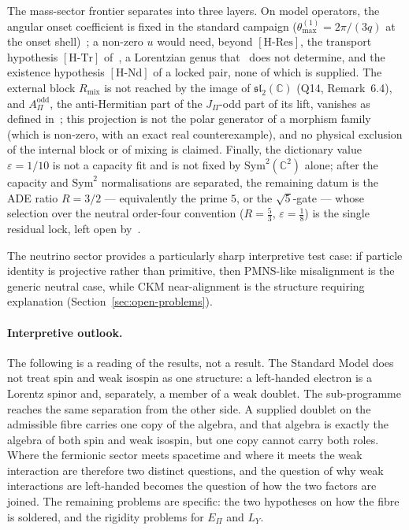 \documentclass[11pt,a4paper]{article}
\theoremstyle{definition}
\newcommand{\Epi}{E_\Pi}
\newcommand{\HRes}{\ensuremath{[\mathrm{H\text{-}Res}]}}
\newcommand{\HTr}{\ensuremath{[\mathrm{H\text{-}Tr}]}}
\newcommand{\HNd}{\ensuremath{[\mathrm{H\text{-}Nd}]}}
\newcommand{\AOdd}{A_\Pi^{\mathrm{odd}}}
\begin{document}
    The mass-sector frontier separates into three layers.
    On model operators, the angular onset coefficient is fixed in the standard campaign
    ($\theta_{\max}^{(1)}=2\pi/(3q)$ at the onset shell)~\cite{Beau2026aar}; a non-zero $u$ would need, beyond \HRes{}, the transport hypothesis
    \HTr{} of~\cite{Beau2026prs}, a Lorentzian genus that~\cite{Beau2026bim} does not determine, and the existence
    hypothesis \HNd{} of a locked pair, none of which is supplied.
    The external block $R_{\mathrm{mix}}$ is not reached by the image of $\mathfrak{sl}_2(\mathbb{C})$ (Q14,
    Remark~6.4), and $\AOdd$, the anti-Hermitian part of the $J_\Pi$-odd part of its lift, vanishes as defined
    in~\cite{Beau2026pyo}; this projection is not the polar generator of a morphism family (which is non-zero, with an
    exact real counterexample), and no physical exclusion of the internal block or of mixing is claimed.
    Finally, the dictionary value $\varepsilon=1/10$ is not a capacity fit and is not fixed by
    $\mathrm{Sym}^2(\mathbb{C}^2)$ alone; after the capacity and $\mathrm{Sym}^2$ normalisations are separated, the
    remaining datum is the ADE ratio $R=3/2$ --- equivalently the prime $5$, or the
    $\sqrt{5}$-gate --- whose selection over the neutral order-four convention ($R=\tfrac53$, $\varepsilon=\tfrac18$)
    is the single residual lock, left open by~\cite{Beau2026aog}.

    The neutrino sector provides a particularly sharp interpretive test case: if particle identity is projective
    rather than primitive, then PMNS-like misalignment is the generic neutral case, while CKM near-alignment is
    the structure requiring explanation (Section~\ref{sec:open-problems}).

    \paragraph{Interpretive outlook.}
    The following is a reading of the results, not a result.
    The Standard Model does not treat spin and weak isospin as one structure: a left-handed electron is a Lorentz
    spinor and, separately, a member of a weak doublet.
    The sub-programme reaches the same separation from the other side.
    A supplied doublet on the admissible fibre carries one copy of the algebra, and that algebra is exactly the algebra
    of both spin and weak isospin, but one copy cannot carry both roles.
    Where the fermionic sector meets spacetime and where it meets the weak interaction are therefore two distinct
    questions, and the question of why weak interactions are left-handed becomes the question of how the two factors
    are joined.
    The remaining problems are specific: the two hypotheses on how the fibre is soldered, and the rigidity problems
    for $\Epi$ and $L_Y$.

    
    
\end{document}
